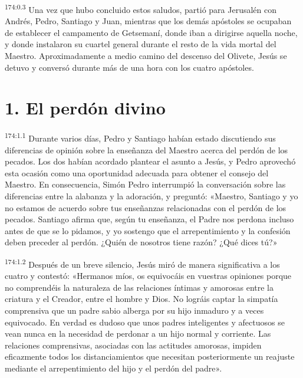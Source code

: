 \par 
\textsuperscript{174:0.3} Una vez que hubo concluido estos saludos, partió para Jerusalén con Andrés, Pedro, Santiago y Juan, mientras que los demás apóstoles se ocupaban de establecer el campamento de Getsemaní, donde iban a dirigirse aquella noche, y donde instalaron su cuartel general durante el resto de la vida mortal del Maestro. Aproximadamente a medio camino del descenso del Olivete, Jesús se detuvo y conversó durante más de una hora con los cuatro apóstoles.

\section*{1. El perdón divino}
\par 
\textsuperscript{174:1.1} Durante varios días, Pedro y Santiago habían estado discutiendo sus diferencias de opinión sobre la enseñanza del Maestro acerca del perdón de los pecados. Los dos habían acordado plantear el asunto a Jesús, y Pedro aprovechó esta ocasión como una oportunidad adecuada para obtener el consejo del Maestro. En consecuencia, Simón Pedro interrumpió la conversación sobre las diferencias entre la alabanza y la adoración, y preguntó: «Maestro, Santiago y yo no estamos de acuerdo sobre tus enseñanzas relacionadas con el perdón de los pecados. Santiago afirma que, según tu enseñanza, el Padre nos perdona incluso antes de que se lo pidamos, y yo sostengo que el arrepentimiento y la confesión deben preceder al perdón. ¿Quién de nosotros tiene razón? ¿Qué dices tú?»

\par 
\textsuperscript{174:1.2} Después de un breve silencio, Jesús miró de manera significativa a los cuatro y contestó: «Hermanos míos, os equivocáis en vuestras opiniones porque no comprendéis la naturaleza de las relaciones íntimas y amorosas entre la criatura y el Creador, entre el hombre y Dios. No lográis captar la simpatía comprensiva que un padre sabio alberga por su hijo inmaduro y a veces equivocado. En verdad es dudoso que unos padres inteligentes y afectuosos se vean nunca en la necesidad de perdonar a un hijo normal y corriente. Las relaciones comprensivas, asociadas con las actitudes amorosas, impiden eficazmente todos los distanciamientos que necesitan posteriormente un reajuste mediante el arrepentimiento del hijo y el perdón del padre».

